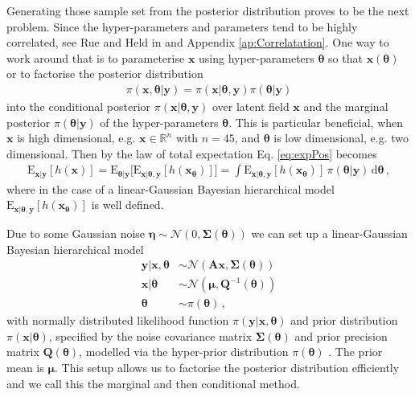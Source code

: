 Generating those sample set from the posterior distribution proves to be the next problem.
Since the hyper-parameters and parameters tend to be highly correlated, see Rue and Held in \cite{rue2005gaussian} and Appendix \ref{ap:Correlatation}.
One way to work around that is to parameterise $\bm{x}$ using hyper-parameters $\bm{\theta}$ so that $\bm{x}(\bm{\theta})$ or to factorise the posterior distribution
\begin{align}
	\pi(\bm{x}, \bm{\theta}|\bm{y}) = \pi(\bm{x}| \bm{\theta}, \bm{y}) \pi(\bm{\theta}|\bm{y})
\end{align}
into the conditional posterior $\pi(\bm{x}|\bm{\theta}, \bm{y})$ over latent field $\bm{x}$ and the marginal posterior $\pi(\bm{\theta}|\bm{y})$ of the hyper-parameters $\bm{\theta}$.
This is particular beneficial, when $\bm{x}$ is high dimensional, e.g. $\bm{x} \in \mathbb{R}^n$ with $n = 45$, and $\bm{\theta}$ is low dimensional, e.g. two dimensional.
Then by the law of total expectation \cite{champ2022generalizedlawtotalcovariance} Eq. \ref{eq:expPos} becomes
\begin{align}
	\text{E}_{\bm{x}|\bm{y}} [h(\bm{x})] = \text{E}_{\bm{\theta}|\bm{y}}   \big[ \text{E}_{\bm{x}|\bm{\theta},\bm{y}} [h(\bm{x}_{\bm{\theta}})] \big]=  \int 	\text{E}_{\bm{x}| \bm{\theta},\bm{y}}  [h(\bm{x}_{\bm{\theta}})] \,  \pi( \bm{\theta} | \bm{y} )  \, \text{d} \bm{\theta}   \label{eq:MargExpPos} \, ,
\end{align}
where in the case of a linear-Gaussian Bayesian hierarchical model $\text{E}_{\bm{x}| \bm{\theta},\bm{y}}  [h(\bm{x}_{\bm{\theta}})]$ is well defined.

Due to some Gaussian noise $\bm{\eta} \sim \mathcal{N}(0, \bm{\Sigma}(\bm{\theta})) $ we can set up a linear-Gaussian Bayesian hierarchical model
\begin{subequations}
	\begin{align}
		\bm{y}|\bm{x}, \bm{\theta}&\sim \mathcal{N}(\bm{A} \bm{x}, \bm{\Sigma}(\bm{\theta})) \label{eq:likelihood}  \\
		\bm{x}| \bm{\theta} & \sim  \mathcal{N}( \bm{\mu}, \bm{Q}^{-1}(\bm{\theta})  ) \label{eq:xPrior} \\
		\bm{\theta} &\sim  \pi(\bm{\theta}) \label{eq:gammaPrior}\, ,
	\end{align}
	\label{eq:BayMode}
\end{subequations}
with normally distributed likelihood function $\pi(\bm{y}|\bm{x}, \bm{\theta})$ and prior distribution $\pi(\bm{x}| \bm{\theta})$, specified by the noise covariance matrix $\bm{\Sigma}(\bm{\theta})$ and prior precision matrix $\bm{Q}(\bm{\theta})$, modelled via the hyper-prior distribution $\pi(\bm{\theta})$ \cite{fox2016fast}.
The prior mean is $\bm{\mu}$.
This setup allows us to factorise the posterior distribution efficiently and we call this the marginal and then conditional method.

